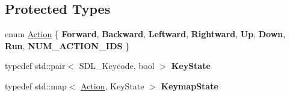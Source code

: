 \subsection*{Protected Types}
\begin{DoxyCompactItemize}
\item 
enum \hyperlink{group___common_gaf299b39b39b578b2235220e5fa8dfc01}{Action} \{ \newline
{\bfseries Forward}, 
{\bfseries Backward}, 
{\bfseries Leftward}, 
{\bfseries Rightward}, 
\newline
{\bfseries Up}, 
{\bfseries Down}, 
{\bfseries Run}, 
{\bfseries N\+U\+M\+\_\+\+A\+C\+T\+I\+O\+N\+\_\+\+I\+DS}
 \}
\item 
\mbox{\label{class_common_1_1_camera_controller_a75aa76cde460aabcb220ca664f3d40a1}} 
typedef std\+::pair$<$ S\+D\+L\+\_\+\+Keycode, bool $>$ {\bfseries Key\+State}
\item 
\mbox{\label{class_common_1_1_camera_controller_a33ec61812e24b2f120a08127435c52dc}} 
typedef std\+::map$<$ \hyperlink{group___common_gaf299b39b39b578b2235220e5fa8dfc01}{Action}, Key\+State $>$ {\bfseries Keymap\+State}
\end{DoxyCompactItemize}

